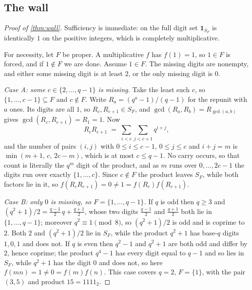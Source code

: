 \documentclass[11pt]{amsart}
\theoremstyle{definition}
\theoremstyle{remark}
\begin{document}
\subsection{The wall}
\label{sub:proof-wall}

\begin{proof}[Proof of \cref{thm:wall}]
Sufficiency is immediate: on the full digit set $\mathbf{1}_{S_{F}}$ is identically $1$ on the positive integers, which is completely multiplicative.

For necessity, let $F$ be proper. A multiplicative $f$ has $f(1) = 1$, so $1 \in F$ is forced, and if $1 \notin F$ we are done. Assume $1 \in F$. The missing digits are nonempty, and either some missing digit is at least $2$, or the only missing digit is $0$.

\emph{Case A: some $c \in \{2,\dots,q-1\}$ is missing.} Take the least such $c$, so $\{1,\dots,c-1\} \subseteq F$ and $c \notin F$. Write $R_{a} = (q^{a}-1)/(q-1)$ for the repunit with $a$ ones. Its digits are all $1$, so $R_{c}, R_{c+1} \in S_{F}$, and $\gcd(R_{a},R_{b}) = R_{\gcd(a,b)}$ gives $\gcd(R_{c},R_{c+1}) = R_{1} = 1$. Now
\[
  R_{c} R_{c+1} \;=\; \sum_{i < c} \sum_{j < c+1} q^{i+j},
\]
and the number of pairs $(i,j)$ with $0 \le i \le c-1$, $0 \le j \le c$ and $i + j = m$ is $\min(m+1,\, c,\, 2c-m)$, which is at most $c \le q - 1$. No carry occurs, so that count is literally the $q^{m}$ digit of the product, and as $m$ runs over $0,\dots,2c-1$ the digits run over exactly $\{1,\dots,c\}$. Since $c \notin F$ the product leaves $S_{F}$, while both factors lie in it, so $f(R_{c}R_{c+1}) = 0 \ne 1 = f(R_{c})f(R_{c+1})$.

\emph{Case B: only $0$ is missing, so $F = \{1,\dots,q-1\}$.} If $q$ is odd then $q \ge 3$ and $(q^{2}+1)/2 = \frac{q-1}{2}\,q + \frac{q+1}{2}$, whose two digits $\frac{q-1}{2}$ and $\frac{q+1}{2}$ both lie in $\{1,\dots,q-1\}$; moreover $q^{2} \equiv 1 \pmod 8$, so $(q^{2}+1)/2$ is odd and is coprime to $2$. Both $2$ and $(q^{2}+1)/2$ lie in $S_{F}$, while the product $q^{2}+1$ has base-$q$ digits $1,0,1$ and does not. If $q$ is even then $q^{2}-1$ and $q^{2}+1$ are both odd and differ by $2$, hence coprime; the product $q^{4}-1$ has every digit equal to $q-1$ and so lies in $S_{F}$, while $q^{2}+1$ has the digit $0$ and does not, so here $f(mn) = 1 \ne 0 = f(m)f(n)$. This case covers $q = 2$, $F = \{1\}$, with the pair $(3,5)$ and product $15 = 1111_{2}$.
\end{proof}
\end{document}
